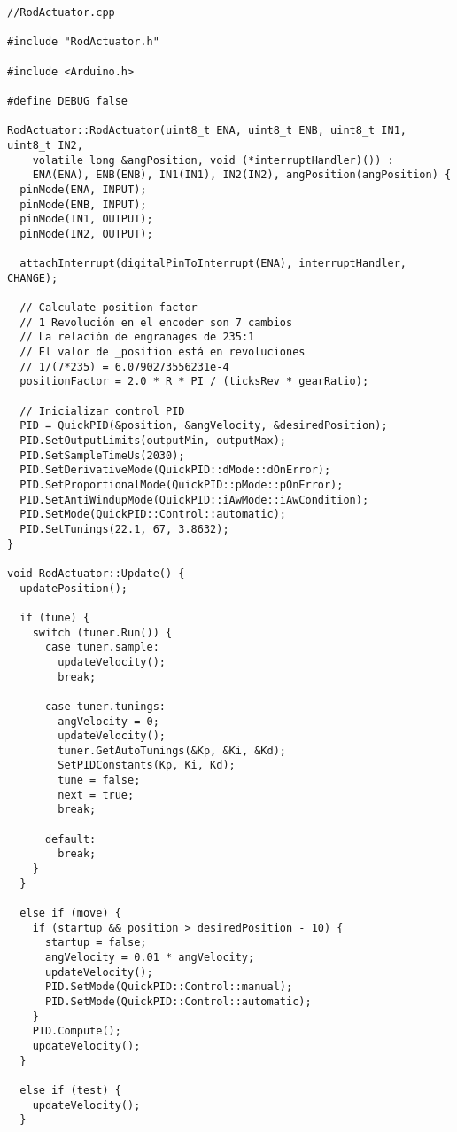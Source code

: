 \begin{verbatim}
//RodActuator.cpp

#include "RodActuator.h"

#include <Arduino.h>

#define DEBUG false

RodActuator::RodActuator(uint8_t ENA, uint8_t ENB, uint8_t IN1, uint8_t IN2,
    volatile long &angPosition, void (*interruptHandler)()) :
    ENA(ENA), ENB(ENB), IN1(IN1), IN2(IN2), angPosition(angPosition) {
  pinMode(ENA, INPUT);
  pinMode(ENB, INPUT);
  pinMode(IN1, OUTPUT);
  pinMode(IN2, OUTPUT);

  attachInterrupt(digitalPinToInterrupt(ENA), interruptHandler, CHANGE);

  // Calculate position factor
  // 1 Revolución en el encoder son 7 cambios
  // La relación de engranages de 235:1
  // El valor de _position está en revoluciones
  // 1/(7*235) = 6.0790273556231e-4
  positionFactor = 2.0 * R * PI / (ticksRev * gearRatio);

  // Inicializar control PID
  PID = QuickPID(&position, &angVelocity, &desiredPosition);
  PID.SetOutputLimits(outputMin, outputMax);
  PID.SetSampleTimeUs(2030);
  PID.SetDerivativeMode(QuickPID::dMode::dOnError);
  PID.SetProportionalMode(QuickPID::pMode::pOnError);
  PID.SetAntiWindupMode(QuickPID::iAwMode::iAwCondition);
  PID.SetMode(QuickPID::Control::automatic);
  PID.SetTunings(22.1, 67, 3.8632);
}

void RodActuator::Update() {
  updatePosition();

  if (tune) {
    switch (tuner.Run()) {
      case tuner.sample:
        updateVelocity();
        break;

      case tuner.tunings:
        angVelocity = 0;
        updateVelocity();
        tuner.GetAutoTunings(&Kp, &Ki, &Kd);
        SetPIDConstants(Kp, Ki, Kd);
        tune = false;
        next = true;
        break;

      default:
        break;
    }
  }

  else if (move) {
    if (startup && position > desiredPosition - 10) {
      startup = false;
      angVelocity = 0.01 * angVelocity;
      updateVelocity();
      PID.SetMode(QuickPID::Control::manual);
      PID.SetMode(QuickPID::Control::automatic);
    }
    PID.Compute();
    updateVelocity();
  }

  else if (test) {
    updateVelocity();
  }


\end{verbatim}
